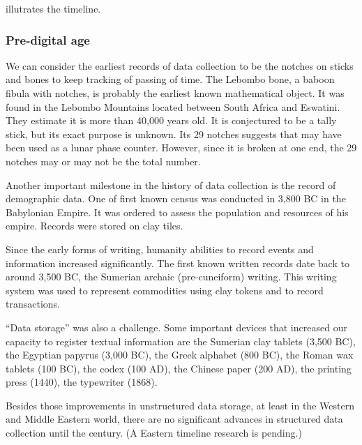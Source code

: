  illutrates the timeline.

\subsubsection{Pre-digital age}

We can consider the earliest records of data collection to be the notches on sticks and
bones to keep tracking of passing of time.  The Lebombo bone, a baboon fibula with
notches, is probably the earliest known mathematical object.  It was found in the Lebombo
Mountains located between South Africa and Eswatini.
They estimate it is more
than 40,000 years old. It is conjectured to be a tally stick, but its exact purpose is
unknown. Its 29 notches suggests that may have been used as a lunar phase counter.
However, since it is broken at one end, the 29 notches may or may not be the total
number.

Another important milestone in the history of data collection is the record of
demographic data.  One of first known census was conducted in 3,800 BC in the Babylonian
Empire.  It was ordered to assess the population and resources of
his empire.  Records were stored on  clay  tiles.

Since the early forms of writing, humanity abilities to record events and information
increased significantly.  The first known written records date back to around 3,500 BC, the
Sumerian archaic (pre-cuneiform) writing.  This writing system was used to represent
commodities using clay tokens and to record transactions.

``Data storage'' was also a challenge.  Some important devices that increased our capacity
to register textual information are the Sumerian clay tablets (3,500 BC), the Egyptian
papyrus (3,000 BC), the Greek alphabet (800 BC), the Roman wax tablets (100 BC), the codex
(100 AD), the Chinese paper (200 AD), the printing press (1440), the typewriter (1868).


Besides those improvements in unstructured data storage, at least in the Western and
Middle Eastern world, there are no significant advances in structured data collection
until the  century.  (A Eastern timeline research is pending.)

